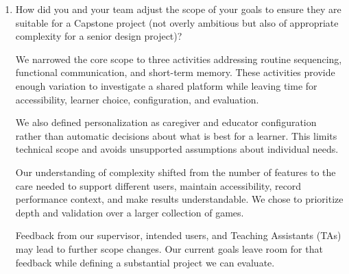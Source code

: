 \documentclass{article}
\begin{document}
\begin{enumerate}
    \item How did you and your team adjust the scope of your goals to ensure
    they are suitable for a Capstone project (not overly ambitious but also of
    appropriate complexity for a senior design project)?

    We narrowed the core scope to three activities addressing routine
    sequencing, functional communication, and short-term memory. These
    activities provide enough variation to investigate a shared platform
    while leaving time for accessibility, learner choice, configuration,
    and evaluation.

    We also defined personalization as caregiver and educator configuration
    rather than automatic decisions about what is best for a learner.
    This limits technical scope and avoids unsupported assumptions about
    individual needs.

    Our understanding of complexity shifted from the number of features to
    the care needed to support different users, maintain accessibility,
    record performance context, and make results understandable. We chose
    to prioritize depth and validation over a larger collection of games.

    Feedback from our supervisor, intended users, and Teaching Assistants
    (TAs) may lead to further scope changes. Our current goals leave room
    for that feedback while defining a substantial project we can evaluate.
\end{enumerate}
\end{document}
